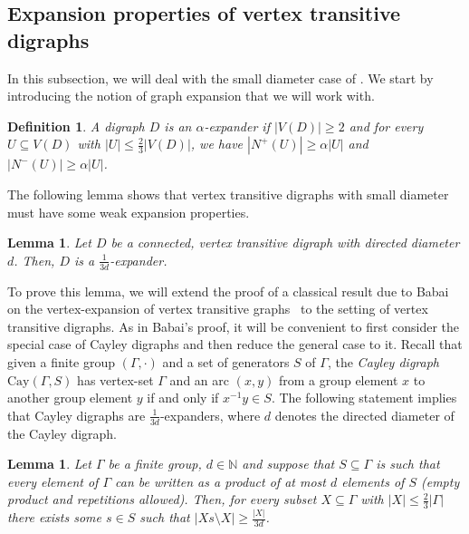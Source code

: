 \documentclass[english,11pt]{article}
\newtheorem{lemma}[theorem]{Lemma}
\newtheorem{definition}[theorem]{Definition}
\theoremstyle{definition}
\numberwithin{equation}{section}
\numberwithin{figure}{section}
\begin{document}
\subsection{Expansion properties of vertex transitive digraphs}\label{subs:expansion}

In this subsection, we will deal with the small diameter case of . We start by introducing the notion of graph expansion that we will work with. 

\begin{definition}\label{defn:expansion}
A digraph $D$ is an \emph{$\alpha$-expander} if $|V(D)|\geq 2$ and for every $U \subseteq V(D)$ with $|U| \le \frac23|V(D)|$, we have $|N^{+}(U)| \ge \alpha |U|$ and $|N^{-}(U)| \ge \alpha |U|$.
\end{definition}

The following lemma shows that vertex transitive digraphs with small diameter must have some weak expansion properties.

\begin{lemma}\label{lem:transitive-implies-expander}
  Let $D$ be a connected, vertex transitive digraph with directed diameter $d$. Then, $D$ is a $\frac{1}{3d}$-expander.
\end{lemma}

To prove this lemma, we will extend the proof of a classical result due to Babai on the vertex-expansion of vertex transitive graphs~\cite{Babai91} to the setting of vertex transitive digraphs. As in Babai's proof, it will be convenient to first consider the special case of Cayley digraphs and then reduce the general case to it. Recall that given a finite group $(\Gamma,\cdot)$ and a set of generators $S$ of $\Gamma$, the \emph{Cayley digraph} $\mathrm{Cay}(\Gamma,S)$ has vertex-set $\Gamma$ and an arc $(x,y)$ from a group element $x$ to another group element $y$ if and only if $x^{-1}y\in S$. The following statement implies that Cayley digraphs are $\frac{1}{3d}$-expanders, where $d$ denotes the directed diameter of the Cayley digraph.

\begin{lemma}\label{lem:cayleydigraph}
Let $\Gamma$ be a finite group, $d\in \mathbb{N}$ and suppose that $S\subseteq \Gamma$ is such that every element of $\Gamma$ can be written as a product of at most $d$ elements of $S$ (empty product and repetitions allowed). Then, for every subset $X\subseteq \Gamma$ with $|X|\le \frac{2}{3}|\Gamma|$ there exists some $s\in S$ such that $|Xs\setminus X|\ge \frac{|X|}{3d}$. 
\end{lemma}
\end{document}
